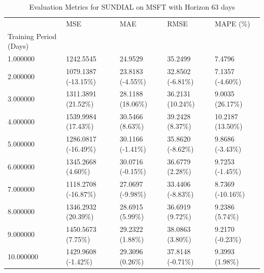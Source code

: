 \begin{table}
\caption{Evaluation Metrics for SUNDIAL on MSFT with Horizon 63 days}
\label{tab:sundial_MSFT_h63_metrics}
\begin{tabular}{lllll}
\toprule
 & MSE & MAE & RMSE & MAPE (\%) \\
Training Period (Days) &  &  &  &  \\
\midrule
1.000000 & 1242.5545 & 24.9529 & 35.2499 & 7.4796 \\
2.000000 & 1079.1387 (-13.15\%) & 23.8183 (-4.55\%) & 32.8502 (-6.81\%) & 7.1357 (-4.60\%) \\
3.000000 & 1311.3891 (21.52\%) & 28.1188 (18.06\%) & 36.2131 (10.24\%) & 9.0035 (26.17\%) \\
4.000000 & 1539.9984 (17.43\%) & 30.5466 (8.63\%) & 39.2428 (8.37\%) & 10.2187 (13.50\%) \\
5.000000 & 1286.0817 (-16.49\%) & 30.1166 (-1.41\%) & 35.8620 (-8.62\%) & 9.8686 (-3.43\%) \\
6.000000 & 1345.2668 (4.60\%) & 30.0716 (-0.15\%) & 36.6779 (2.28\%) & 9.7253 (-1.45\%) \\
7.000000 & 1118.2708 (-16.87\%) & 27.0697 (-9.98\%) & 33.4406 (-8.83\%) & 8.7369 (-10.16\%) \\
8.000000 & 1346.2932 (20.39\%) & 28.6915 (5.99\%) & 36.6919 (9.72\%) & 9.2386 (5.74\%) \\
9.000000 & 1450.5673 (7.75\%) & 29.2322 (1.88\%) & 38.0863 (3.80\%) & 9.2170 (-0.23\%) \\
10.000000 & 1429.9608 (-1.42\%) & 29.3096 (0.26\%) & 37.8148 (-0.71\%) & 9.3993 (1.98\%) \\
\bottomrule
\end{tabular}
\end{table}
